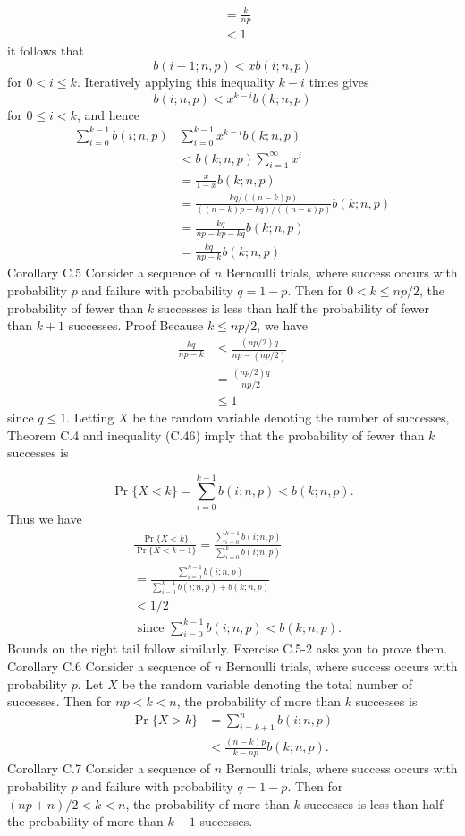 \documentclass[lang=cn,newtx,10pt,scheme=chinese]{elegantbook}
\begin{document}
$$
\begin{aligned}
& =\frac{k}{n p} \\
& <1
\end{aligned}
$$
it follows that
$$
b(i-1 ; n, p)<x b(i ; n, p)
$$
for $0<i \leq k$. Iteratively applying this inequality $k-i$ times gives
$$
b(i ; n, p)<x^{k-i} b(k ; n, p)
$$
for $0 \leq i<k$, and hence
$$
\begin{aligned}
\sum_{i=0}^{k-1} b(i ; n, p) & \sum_{i=0}^{k-1} x^{k-i} b(k ; n, p) \\
& <b(k ; n, p) \sum_{i=1}^{\infty} x^i \\
& =\frac{x}{1-x} b(k ; n, p) \\
& =\frac{k q /((n-k) p)}{((n-k) p-k q) /((n-k) p)} b(k ; n, p) \\
& =\frac{k q}{n p-k p-k q} b(k ; n, p) \\
& =\frac{k q}{n p-k} b(k ; n, p)
\end{aligned}
$$
Corollary C.5
Consider a sequence of $n$ Bernoulli trials, where success occurs with probability $p$ and failure with probability $q=1-p$. Then for $0<k \leq n p / 2$, the probability of fewer than $k$ successes is less than half the probability of fewer than $k+1$ successes.
Proof Because $k \leq n p / 2$, we have
$$
\begin{aligned}
\frac{k q}{n p-k} & \leq \frac{(n p / 2) q}{n p-(n p / 2)} \\
& =\frac{(n p / 2) q}{n p / 2} \\
& \leq 1
\end{aligned}
$$
since $q \leq 1$. Letting $X$ be the random variable denoting the number of successes, Theorem C.4 and inequality (C.46) imply that the probability of fewer than $k$ successes is

$$
\operatorname{Pr}\{X<k\}=\sum_{i=0}^{k-1} b(i ; n, p)<b(k ; n, p) .
$$
Thus we have
$$
\begin{aligned}
& \frac{\operatorname{Pr}\{X<k\}}{\operatorname{Pr}\{X<k+1\}}=\frac{\sum_{i=0}^{k-1} b(i ; n, p)}{\sum_{i=0}^k b(i ; n, p)} \\
&=\frac{\sum_{i=0}^{k-1} b(i ; n, p)}{\sum_{i=0}^{k-1} b(i ; n, p)+b(k ; n, p)} \\
&<1 / 2 \\
& \text { since } \sum_{i=0}^{k-1} b(i ; n, p)<b(k ; n, p) .
\end{aligned}
$$
Bounds on the right tail follow similarly. Exercise C.5-2 asks you to prove them.
Corollary C.6
Consider a sequence of $n$ Bernoulli trials, where success occurs with probability $p$. Let $X$ be the random variable denoting the total number of successes. Then for $n p<k<n$, the probability of more than $k$ successes is
$$
\begin{aligned}
\operatorname{Pr}\{X>k\} & =\sum_{i=k+1}^n b(i ; n, p) \\
& <\frac{(n-k) p}{k-n p} b(k ; n, p) .
\end{aligned}
$$
Corollary C.7
Consider a sequence of $n$ Bernoulli trials, where success occurs with probability $p$ and failure with probability $q=1-p$. Then for $(n p+n) / 2<k<n$, the probability of more than $k$ successes is less than half the probability of more than $k-1$ successes.
\end{document}
